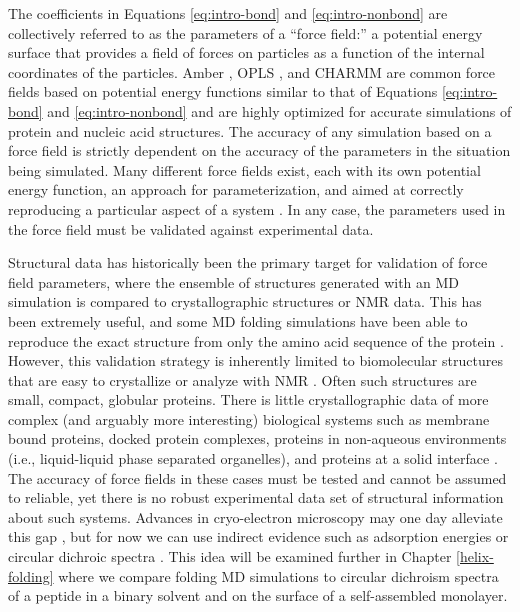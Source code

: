 The coefficients in Equations \ref{eq:intro-bond} and \ref{eq:intro-nonbond} are collectively referred to as the parameters of a ``force field:'' a potential energy surface that provides a field of forces on particles as a function of the internal coordinates of the particles. 
Amber \cite{Duan2003}, OPLS \cite{Jorgensen1996, Kaminski2001}, and CHARMM \cite{Best2012} are common force fields based on potential energy functions similar to that of Equations \ref{eq:intro-bond} and \ref{eq:intro-nonbond} and are highly optimized for accurate simulations of protein and nucleic acid structures. 
The accuracy of any simulation based on a force field is strictly dependent on the accuracy of the parameters in the situation being simulated. 
Many different force fields exist, each with its own potential energy function, an approach for parameterization, and aimed at correctly reproducing a particular aspect of a system \cite{Mayo1990, Rappe1992, Cornell1995, Maple1994, Gao1995, Allinger1996, Lamoureux2003, Oostenbrink2004, Patel2004, Swart2006, Ponder2010}. 
In any case, the parameters used in the force field must be validated against experimental data. 

Structural data has historically been the primary target for validation of force field parameters, where the ensemble of structures generated with an MD simulation is compared to crystallographic structures or NMR data. 
This has been extremely useful, and some MD folding simulations have been able to reproduce the exact structure from only the amino acid sequence of the protein \cite{Duan1998, Lindorff-Larsen2011, Bowman2011, Voelz2012, Shaw2010, Lane2013, Koukos2014}. 
However, this validation strategy is inherently limited to biomolecular structures that are easy to crystallize or analyze with NMR \cite{Berman2000}.
Often such structures are small, compact, globular proteins. 
There is little crystallographic data of more complex (and arguably more interesting) biological systems such as membrane bound proteins, docked protein complexes, proteins in non-aqueous environments (i.e., liquid-liquid phase separated organelles), and proteins at a solid interface \cite{Berman2013}. 
The accuracy of force fields in these cases must be tested and cannot be assumed to reliable, yet there is no robust experimental data set of structural information about such systems. 
Advances in cryo-electron microscopy may one day alleviate this gap \cite{Murata2018}, but for now we can use indirect evidence such as adsorption energies\cite{Latour2002, Raut2005, Abramyan2015} or circular dichroic spectra \cite{Holzwarth1965, Woody1967, Johnson1988, Berova2000circular, Kelly2005}.
This idea will be examined further in Chapter \ref{helix-folding} where we compare folding MD simulations to circular dichroism spectra of a peptide in a binary solvent and on the surface of a self-assembled monolayer. 

